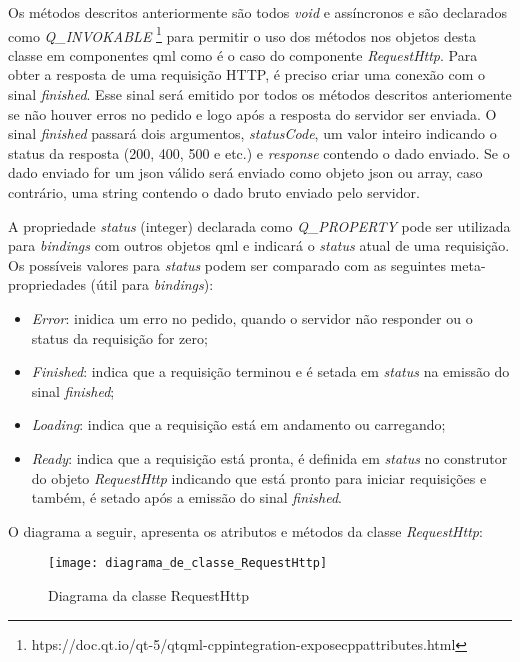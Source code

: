 Os métodos descritos anteriormente são todos \textit{void} e assíncronos e são declarados como \textit{Q\_INVOKABLE} \footnote{htps://doc.qt.io/qt-5/qtqml-cppintegration-exposecppattributes.html} para permitir o uso dos métodos nos objetos desta classe em componentes qml como é o caso do componente \textit{RequestHttp}. Para obter a resposta de uma requisição HTTP, é preciso criar uma conexão com o sinal \textit{finished}. Esse sinal será emitido por todos os métodos descritos anteriomente se não houver erros no pedido e logo após a resposta do servidor ser enviada. O sinal \textit{finished} passará dois argumentos, \textit{statusCode}, um valor inteiro indicando o status da resposta (200, 400, 500 e etc.) e \textit{response} contendo o dado enviado. Se o dado enviado for um json válido será enviado como objeto json ou array, caso contrário, uma string contendo o dado bruto enviado pelo servidor.\par

A propriedade \textit{status} (integer) declarada como \textit{Q\_PROPERTY} pode ser utilizada para \textit{bindings} com outros objetos qml e indicará o \textit{status} atual de uma requisição. Os possíveis valores para \textit{status} podem ser comparado com as seguintes meta-propriedades (útil para \textit{bindings}):

\begin{itemize}
	\item \textit{Error}: inidica um erro no pedido, quando o servidor não responder ou o status da requisição for zero;
	\item \textit{Finished}: indica que a requisição terminou e é setada em \textit{status} na emissão do sinal \textit{finished};
	\item \textit{Loading}: indica que a requisição está em andamento ou carregando;
	\item \textit{Ready}: indica que a requisição está pronta, é definida em \textit{status} no construtor do objeto \textit{RequestHttp} indicando que está pronto para iniciar requisições e também, é setado após a emissão do sinal \textit{finished}.
\end{itemize}

O diagrama a seguir, apresenta os atributos e métodos da classe \textit{RequestHttp}:

\begin{figure}[h]
	\texttt{[image: diagrama\_de\_classe\_RequestHttp]}
	\centering
	\caption{Diagrama da classe RequestHttp}
\end{figure}

